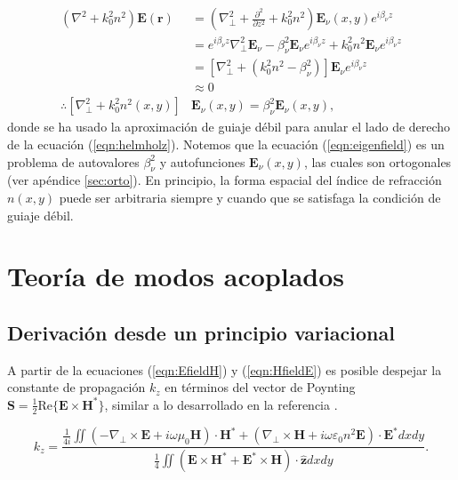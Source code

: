 \begin{align}
	(\nabla^2  + k_0^2n^2) \textbf{E}(\textbf{r}) &= \left(\nabla_\perp^2 + \frac{\partial^2}{\partial z^2} + k_0^2n^2\right) \textbf{E}_\nu(x, y)  e^{i\beta_\nu z} \nonumber
\\	
	&= e^{i\beta_\nu z} \nabla_\perp^2 \textbf{E}_\nu -\beta_\nu^2\textbf{E}_\nu e^{i\beta_\nu z} + k_0^2n^2 \textbf{E}_\nu  e^{i\beta_\nu z}
\nonumber	
	\\	
	&= \left[  \nabla_\perp^2  + (k_0^2n^2-\beta_\nu^2) \right]\textbf{E}_\nu  e^{i\beta_\nu z}
	\nonumber	
	\\
	&\approx
	0
	\nonumber
	\\
	\therefore
	 \left[  \nabla_\perp^2  + k_0^2n^2(x,y) \right]&\textbf{E}_\nu(x,y)  = \beta_\nu^2 \textbf{E}_\nu(x,y), \label{eqn:eigenfield}
\end{align}
donde se ha usado la aproximación de guiaje débil para anular el lado de derecho de la ecuación (\ref{eqn:helmholz}). Notemos que la ecuación (\ref{eqn:eigenfield}) es un problema de autovalores $\beta_\nu^2$ y autofunciones $\textbf{E}_\nu(x,y)$, las cuales son ortogonales (ver apéndice \ref{sec:orto}). En principio, la forma espacial del índice de refracción $n(x, y)$ puede ser arbitraria siempre y cuando que se satisfaga la condición de guiaje débil. 

\section{Teoría de modos acoplados}

\subsection{Derivación desde un principio variacional}

A partir de la ecuaciones (\ref{eqn:EfieldH}) y (\ref{eqn:HfieldE}) es posible despejar la constante de propagación $k_z$ en términos del vector de Poynting $\textbf{S} = \frac{1}{2} \text{Re}\{\textbf{E} \times \textbf{H}^*\}$, similar a lo desarrollado en la referencia \citep{haus_coupled-mode}.

\begin{equation}
	k_z = \frac{\frac{1}{4i}\iint \left(-\nabla_\perp \times \textbf{E} + i\omega \mu_0 \textbf{H} \right)\cdot\textbf{H}^* + \left(\nabla_\perp\times\textbf{H} + i\omega \varepsilon_0 n^2 \textbf{E} \right)\cdot \textbf{E}^* dxdy}{\frac{1}{4} \iint \left( \textbf{E}\times\textbf{H}^* + \textbf{E}^*\times\textbf{H}  \right) \cdot \hat{\textbf{z}} dxdy}. \label{eqn:kzprevar}
\end{equation}

